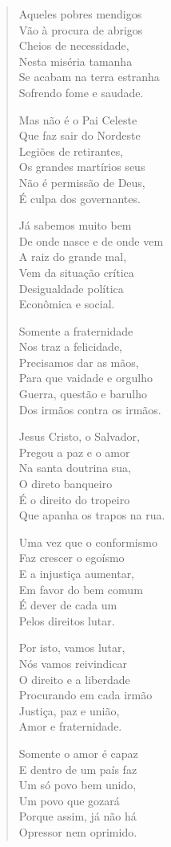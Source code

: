 \begin{verse}
Aqueles pobres mendigos\\
Vão à procura de abrigos\\
Cheios de necessidade,\\
Nesta miséria tamanha\\
Se acabam na terra estranha\\
Sofrendo fome e saudade.

Mas não é o Pai Celeste\\
Que faz sair do Nordeste\\
Legiões de retirantes,\\
Os grandes martírios seus\\
Não é permissão de Deus,\\
É culpa dos governantes.

Já sabemos muito bem\\
De onde nasce e de onde vem\\
A raiz do grande mal,\\
Vem da situação crítica\\
Desigualdade política\\
Econômica e social.

Somente a fraternidade\\
Nos traz a felicidade,\\
Precisamos dar as mãos,\\
Para que vaidade e orgulho\\
Guerra, questão e barulho\\
Dos irmãos contra os irmãos.

Jesus Cristo, o Salvador,\\
Pregou a paz e o amor\\
Na santa doutrina sua,\\
O direto banqueiro\\
É o direito do tropeiro\\
Que apanha os trapos na rua.

Uma vez que o conformismo\\
Faz crescer o egoísmo\\
E a injustiça aumentar,\\
Em favor do bem comum\\
É dever de cada um\\
Pelos direitos lutar.

Por isto, vamos lutar,\\
Nós vamos reivindicar\\
O direito e a liberdade\\
Procurando em cada irmão\\
Justiça, paz e união,\\
Amor e fraternidade.

Somente o amor é capaz\\
E dentro de um país faz\\
Um só povo bem unido,\\
Um povo que gozará\\
Porque assim, já não há\\
Opressor nem oprimido.
\end{verse}

